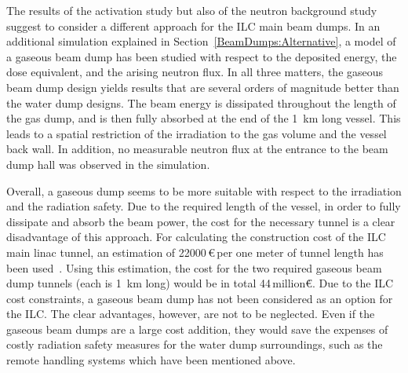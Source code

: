 The results of the activation study but also of the neutron background study suggest to consider a different approach for the ILC main beam dumps.
In an additional \fluka simulation explained in Section~\ref{BeamDumps:Alternative}, a model of a gaseous beam dump has been studied with respect to the deposited energy, the dose equivalent, and the arising neutron flux.
In all three matters, the gaseous beam dump design yields results that are several orders of magnitude better than the water dump designs.
The beam energy is dissipated throughout the length of the gas dump, and is then fully absorbed at the end of the \SI{1}{\kilo\meter} long vessel.
This leads to a spatial restriction of the irradiation to the gas volume and the vessel back wall.
In addition, no measurable neutron flux at the entrance to the beam dump hall was observed in the \fluka simulation.

Overall, a gaseous dump seems to be more suitable with respect to the irradiation and the radiation safety.
Due to the required length of the vessel, in order to fully dissipate and absorb the beam power, the cost for the necessary tunnel is a clear disadvantage of this approach.
For calculating the construction cost of the ILC main linac tunnel, an estimation of \num{22000}\,\euro\,per one meter of tunnel length has been used~\cite{TunnelCost}.
Using this estimation, the cost for the two required gaseous beam dump tunnels (each is \SI{1}{\kilo\meter} long) would be in total \num{44}\,million\.\euro.
Due to the ILC cost constraints, a gaseous beam dump has not been considered as an option for the ILC.
The clear advantages, however, are not to be neglected.
Even if the gaseous beam dumps are a large cost addition, they would save the expenses of costly radiation safety measures for the water dump surroundings, such as the remote handling systems which have been mentioned above.